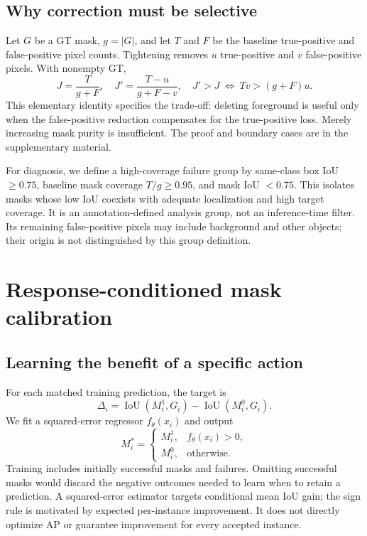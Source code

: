 \documentclass[times,twocolumn,final,authoryear]{elsarticle}
\begin{document}
\subsection{Why correction must be selective}
Let $G$ be a GT mask, $g=|G|$, and let $T$ and $F$ be the baseline true-positive and false-positive pixel counts. Tightening removes $u$ true-positive and $v$ false-positive pixels. With nonempty GT,
\begin{equation}
 J=\frac{T}{g+F},\quad J'=\frac{T-u}{g+F-v},\quad
 J'>J\ \Longleftrightarrow\ Tv>(g+F)u.
 \label{eq:condition}
\end{equation}
This elementary identity specifies the trade-off: deleting foreground is useful only when the false-positive reduction compensates for the true-positive loss. Merely increasing mask purity is insufficient. The proof and boundary cases are in the supplementary material.

For diagnosis, we define a high-coverage failure group by same-class box IoU $\geq0.75$, baseline mask coverage $T/g\geq0.95$, and mask IoU $<0.75$. This isolates masks whose low IoU coexists with adequate localization and high target coverage. It is an annotation-defined analysis group, not an inference-time filter. Its remaining false-positive pixels may include background and other objects; their origin is not distinguished by this group definition.

\section{Response-conditioned mask calibration}
\subsection{Learning the benefit of a specific action}
For each matched training prediction, the target is
\begin{equation}
 \Delta_i=\operatorname{IoU}(M_i^1,G_i)-\operatorname{IoU}(M_i^0,G_i).
 \label{eq:target}
\end{equation}
We fit a squared-error regressor $f_\theta(x_i)$ and output
\begin{equation}
 M_i^{*}=\begin{cases}
 M_i^1,& f_\theta(x_i)>0,\\
 M_i^0,& \text{otherwise}.
 \end{cases}\label{eq:gate}
\end{equation}
Training includes initially successful masks and failures. Omitting successful masks would discard the negative outcomes needed to learn when to retain a prediction. A squared-error estimator targets conditional mean IoU gain; the sign rule is motivated by expected per-instance improvement. It does not directly optimize AP or guarantee improvement for every accepted instance.
\end{document}
